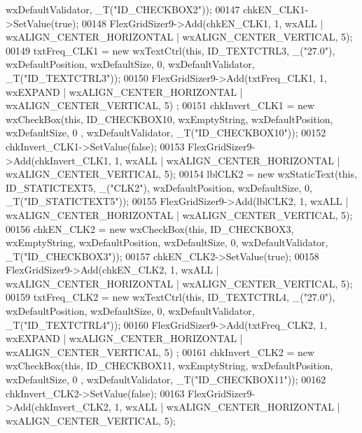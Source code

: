 \begin{DoxyCode}
      wxDefaultValidator, _T(\textcolor{stringliteral}{"ID\_CHECKBOX2"}));
00147     chkEN\_CLK1->SetValue(\textcolor{keyword}{true});
00148     FlexGridSizer9->Add(chkEN\_CLK1, 1, wxALL | wxALIGN\_CENTER\_HORIZONTAL | wxALIGN\_CENTER\_VERTICAL, 5);
00149     txtFreq\_CLK1 = \textcolor{keyword}{new} wxTextCtrl(\textcolor{keyword}{this}, ID\_TEXTCTRL3, \_(\textcolor{stringliteral}{"27.0"}), wxDefaultPosition, wxDefaultSize, 0, 
      wxDefaultValidator, _T(\textcolor{stringliteral}{"ID\_TEXTCTRL3"}));
00150     FlexGridSizer9->Add(txtFreq\_CLK1, 1, wxEXPAND | wxALIGN\_CENTER\_HORIZONTAL | wxALIGN\_CENTER\_VERTICAL, 5)
      ;
00151     chkInvert\_CLK1 = \textcolor{keyword}{new} wxCheckBox(\textcolor{keyword}{this}, ID\_CHECKBOX10, wxEmptyString, wxDefaultPosition, wxDefaultSize, 0
      , wxDefaultValidator, _T(\textcolor{stringliteral}{"ID\_CHECKBOX10"}));
00152     chkInvert\_CLK1->SetValue(\textcolor{keyword}{false});
00153     FlexGridSizer9->Add(chkInvert\_CLK1, 1, wxALL | wxALIGN\_CENTER\_HORIZONTAL | wxALIGN\_CENTER\_VERTICAL, 5);
00154     lblCLK2 = \textcolor{keyword}{new} wxStaticText(\textcolor{keyword}{this}, ID\_STATICTEXT5, \_(\textcolor{stringliteral}{"CLK2"}), wxDefaultPosition, wxDefaultSize, 0, 
      _T(\textcolor{stringliteral}{"ID\_STATICTEXT5"}));
00155     FlexGridSizer9->Add(lblCLK2, 1, wxALL | wxALIGN\_CENTER\_HORIZONTAL | wxALIGN\_CENTER\_VERTICAL, 5);
00156     chkEN\_CLK2 = \textcolor{keyword}{new} wxCheckBox(\textcolor{keyword}{this}, ID\_CHECKBOX3, wxEmptyString, wxDefaultPosition, wxDefaultSize, 0, 
      wxDefaultValidator, _T(\textcolor{stringliteral}{"ID\_CHECKBOX3"}));
00157     chkEN\_CLK2->SetValue(\textcolor{keyword}{true});
00158     FlexGridSizer9->Add(chkEN\_CLK2, 1, wxALL | wxALIGN\_CENTER\_HORIZONTAL | wxALIGN\_CENTER\_VERTICAL, 5);
00159     txtFreq\_CLK2 = \textcolor{keyword}{new} wxTextCtrl(\textcolor{keyword}{this}, ID\_TEXTCTRL4, \_(\textcolor{stringliteral}{"27.0"}), wxDefaultPosition, wxDefaultSize, 0, 
      wxDefaultValidator, _T(\textcolor{stringliteral}{"ID\_TEXTCTRL4"}));
00160     FlexGridSizer9->Add(txtFreq\_CLK2, 1, wxEXPAND | wxALIGN\_CENTER\_HORIZONTAL | wxALIGN\_CENTER\_VERTICAL, 5)
      ;
00161     chkInvert\_CLK2 = \textcolor{keyword}{new} wxCheckBox(\textcolor{keyword}{this}, ID\_CHECKBOX11, wxEmptyString, wxDefaultPosition, wxDefaultSize, 0
      , wxDefaultValidator, _T(\textcolor{stringliteral}{"ID\_CHECKBOX11"}));
00162     chkInvert\_CLK2->SetValue(\textcolor{keyword}{false});
00163     FlexGridSizer9->Add(chkInvert\_CLK2, 1, wxALL | wxALIGN\_CENTER\_HORIZONTAL | wxALIGN\_CENTER\_VERTICAL, 5);

\end{DoxyCode}
